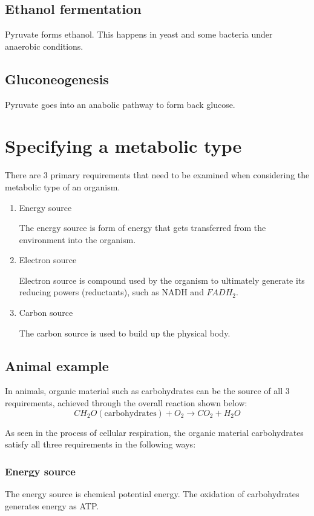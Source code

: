 \documentclass[11pt]{article}
\begin{document}
\subsection{Ethanol fermentation}
\label{sec:orgf8c7045}
Pyruvate forms ethanol. This happens in yeast and some bacteria under anaerobic conditions.

\subsection{Gluconeogenesis}
\label{sec:orge444b1f}
Pyruvate goes into an anabolic pathway to form back glucose.


\section{Specifying a metabolic type}
\label{sec:org44e50f4}
There are 3 primary requirements that need to be examined when considering the metabolic type of an organism.

\begin{enumerate}
\item Energy source
\label{sec:org1659e97}

The energy source is form of energy that gets transferred from the environment into the organism.

\item Electron source
\label{sec:org5ef04c1}

Electron source is compound used by the organism to ultimately generate its reducing powers (reductants), such as NADH and \(FADH_2\).

\item Carbon source
\label{sec:orgbab59eb}

The carbon source is used to build up the physical body.
\end{enumerate}

\subsection{Animal example}
\label{sec:org1d1751f}
In animals, organic material such as carbohydrates can be the source of all 3 requirements, achieved through the overall reaction shown below:
\[CH_2 O (\text{carbohydrates}) + O_2 \rightarrow CO_2 + H_2 O\]

As seen in the process of cellular respiration, the organic material carbohydrates satisfy all three requirements in the following ways:

\subsubsection{Energy source}
\label{sec:orgb2d8418}
The energy source is chemical potential energy. The oxidation of carbohydrates generates energy as ATP.
\end{document}
